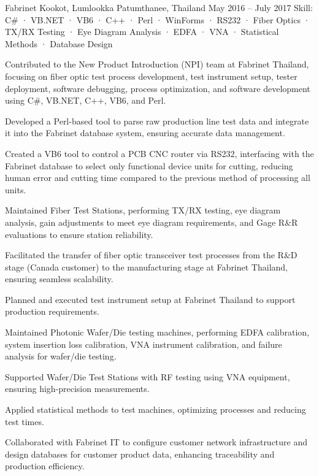 \begin{cventries}
    {Fabrinet} %
    {Kookot, Lumlookka Patumthanee, Thailand} %
    {May 2016 -- July 2017} %
    {Skill: C\# · VB.NET · VB6 · C++ · Perl · WinForms · RS232 · Fiber Optics · TX/RX Testing · Eye Diagram Analysis · EDFA · VNA · Statistical Methods · Database Design} %
    {
      \begin{cvitems} %
       \item {Contributed to the New Product Introduction (NPI) team at Fabrinet Thailand, focusing on fiber optic test process development, test instrument setup, tester deployment, software debugging, process optimization, and software development using C\#, VB.NET, C++, VB6, and Perl.}
       \item {Developed a Perl-based tool to parse raw production line test data and integrate it into the Fabrinet database system, ensuring accurate data management.}
       \item {Created a VB6 tool to control a PCB CNC router via RS232, interfacing with the Fabrinet database to select only functional device units for cutting, reducing human error and cutting time compared to the previous method of processing all units.}
       \item {Maintained Fiber Test Stations, performing TX/RX testing, eye diagram analysis, gain adjustments to meet eye diagram requirements, and Gage R\&R evaluations to ensure station reliability.}
       \item {Facilitated the transfer of fiber optic transceiver test processes from the R\&D stage (Canada customer) to the manufacturing stage at Fabrinet Thailand, ensuring seamless scalability.}
       \item {Planned and executed test instrument setup at Fabrinet Thailand to support production requirements.}
       \item {Maintained Photonic Wafer/Die testing machines, performing EDFA calibration, system insertion loss calibration, VNA instrument calibration, and failure analysis for wafer/die testing.}
       \item {Supported Wafer/Die Test Stations with RF testing using VNA equipment, ensuring high-precision measurements.}
       \item {Applied statistical methods to test machines, optimizing processes and reducing test times.}
       \item {Collaborated with Fabrinet IT to configure customer network infrastructure and design databases for customer product data, enhancing traceability and production efficiency.}
      \end{cvitems}
    }


\end{cventries}
